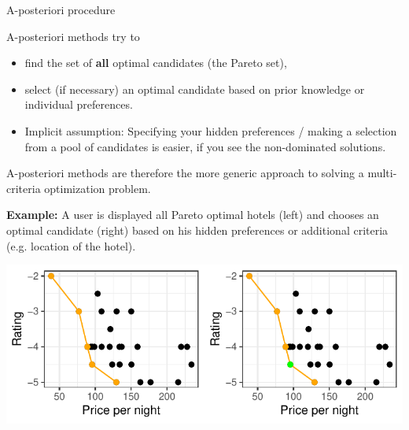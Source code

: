 \begin{frame}[allowframebreaks]{A-posteriori procedure}

A-posteriori methods try to

\begin{itemize}
\item find the set of \textbf{all} optimal candidates (the Pareto set),
\item select (if necessary) an optimal candidate based on prior knowledge or individual preferences.
\item Implicit assumption: Specifying your hidden preferences / making a selection from a pool of candidates is easier, if you see the non-dominated solutions.
\end{itemize}

A-posteriori methods are therefore the more generic approach to solving a multi-criteria optimization problem.


\framebreak

\textbf{Example:} A user is displayed all Pareto optimal hotels (left) and chooses an optimal candidate (right) based on his hidden preferences or additional criteria (e.g. location of the hotel).

\vspace*{0.1cm}


\centering \includegraphics[scale=1]{images/expedia-11-1}


\end{frame}


